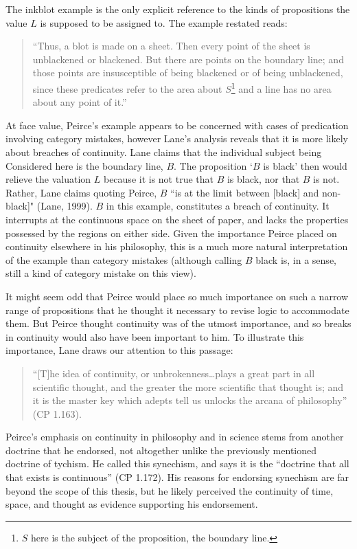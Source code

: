  The inkblot example is the only explicit reference to the kinds of propositions the value $L$ is supposed to be assigned to. The example restated reads: 
\begin{quotation}
\noindent``Thus, a blot is made on a sheet. Then every point of the sheet is unblackened or blackened. But there are points on the boundary line; and those points are insusceptible of being blackened or of being unblackened, since these predicates refer to the area about $S$\footnote{$S$ here is the subject of the proposition, the boundary line.} and a line has no area about any point of it.''
\end{quotation}
\noindent At face value, Peirce's example appears to be concerned with cases of predication involving category mistakes, however Lane's analysis reveals that it is more likely about breaches of continuity. Lane claims that the individual subject being Considered here is the boundary line, $B$. The proposition `$B$ is black' then would relieve the valuation $L$ because it is not true that $B$ is black, nor that $B$ is not. Rather, Lane claims quoting Peirce, $B$ ``is at the limit between [black] and non-black]" (Lane, 1999). $B$ in this example, constitutes a breach of continuity. It interrupts at the continuous space on the sheet of paper, and lacks the properties possessed by the regions on either side. Given the importance Peirce placed on continuity elsewhere in his philosophy, this is a much more natural interpretation of the example than category mistakes (although calling $B$ black is, in a sense, still a kind of category mistake on this view).
 
 It might seem odd that Peirce would place so much importance on such a narrow range of propositions that he thought it necessary to revise logic to accommodate them. But Peirce thought continuity was of the utmost importance, and so breaks in continuity would also have been important to him. To illustrate this importance, Lane draws our attention to this passage:
 \begin{quotation}
\noindent``[T]he idea of continuity, or unbrokenness\dots plays a great part in all scientific thought, and the greater the more scientific that thought is; and it is the master key which adepts tell us unlocks the arcana of philosophy'' (CP 1.163).
\end{quotation}
\noindent Peirce's emphasis on continuity in philosophy and in science stems from another doctrine that he endorsed, not altogether unlike the previously mentioned doctrine of tychism. He called this synechism, and says it is the ``doctrine that all that exists is continuous'' (CP 1.172). His reasons for endorsing synechism are far beyond the scope of this thesis, but he likely perceived the continuity of time, space, and thought as evidence supporting his endorsement.

